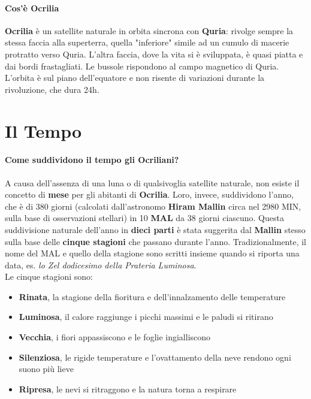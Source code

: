 \documentclass[10pt,twoside,onecolumn,openany]{book}
\begin{document}
\paragraph{Cos'è Ocrilia} \textbf{Ocrilia} è un satellite naturale in orbita sincrona con \textbf{Quria}: rivolge sempre la stessa faccia alla superterra, quella "inferiore" simile ad un cumulo di macerie protratto verso Quria. L'altra faccia, dove la vita si è sviluppata, è quasi piatta e dai bordi frastagliati. Le bussole rispondono al campo magnetico di Quria. L'orbita è sul piano dell'equatore e non risente di variazioni durante la rivoluzione, che dura 24h.\\
\newpage
\section{Il Tempo}
\paragraph{Come suddividono il tempo gli Ocriliani?}
A causa dell'assenza di una luna o di qualsivoglia satellite naturale, non esiste il concetto di \textbf{mese} per gli abitanti di \textbf{Ocrilia}. Loro, invece, suddividono l'anno, che è di 380 giorni (calcolati dall'astronomo \textbf{Hiram Mallin} circa nel 2980 MIN, sulla base di osservazioni stellari) in 10 \textbf{MAL} da 38 giorni ciascuno. Questa suddivisione naturale dell'anno in \textbf{dieci parti} è stata suggerita dal \textbf{Mallin} stesso sulla base delle \textbf{cinque stagioni} che passano durante l'anno. Tradizionalmente, il nome del MAL e quello della stagione sono scritti insieme quando si riporta una data, es. \textit{lo Zel dodicesimo della Prateria Luminosa}.\\
Le cinque stagioni sono:
\begin{multicols}{2}
\begin{itemize}
\item \textbf{Rinata}, la stagione della fioritura e dell'innalzamento delle temperature
\item \textbf{Luminosa}, il calore raggiunge i picchi massimi e le paludi si ritirano
\item \textbf{Vecchia}, i fiori appassiscono e le foglie ingialliscono
\item \textbf{Silenziosa}, le rigide temperature e l'ovattamento della neve rendono ogni suono più lieve
\item \textbf{Ripresa}, le nevi si ritraggono e la natura torna a respirare
\end{itemize}
\end{multicols}
\end{document}
